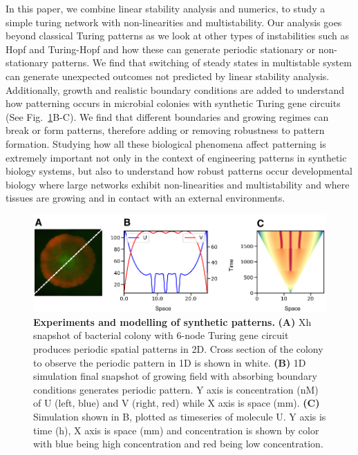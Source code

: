 In this paper, we combine linear stability analysis and numerics, to study a simple turing network with non-linearities and multistability.
Our analysis goes beyond classical Turing patterns as we look at other types of instabilities such as Hopf and Turing-Hopf and how these can generate periodic stationary or non-stationary patterns.
We find that switching of steady states in multistable system can generate unexpected outcomes not predicted by linear stability analysis.
Additionally, growth and realistic boundary conditions are added to understand how patterning occurs in microbial colonies with synthetic Turing gene circuits (See Fig.~\ref{fig1}B-C).
We find that different boundaries and growing regimes can break or form patterns, therefore adding or removing robustness to pattern formation.
Studying how all these biological phenomena affect patterning is extremely important not only in the context of engineering patterns in synthetic biology systems, but also to understand how robust patterns occur developmental biology where large networks exhibit non-linearities and multistability and where tissues are growing and in contact with an external environments.


\begin{figure}[H]
    \includegraphics[width=1\textwidth]{figures/biological_example}

    \caption{{\bf Experiments and modelling of synthetic patterns.}
        \textbf{(A)} Xh snapshot of bacterial colony with 6-node Turing gene circuit produces periodic spatial patterns in 2D. Cross section of the colony to observe the periodic pattern in 1D is shown in white. \textbf{(B)} 1D simulation final snapshot of growing field with absorbing boundary conditions generates periodic pattern. Y axis is concentration (nM) of U (left, blue) and V (right, red) while X axis is space (mm). \textbf{(C)} Simulation shown in B, plotted as timeseries of molecule U. Y axis is time (h), X axis is space (mm) and concentration is shown by color with blue being high concentration and red being low concentration. }
    \label{fig1}
\end{figure}
 